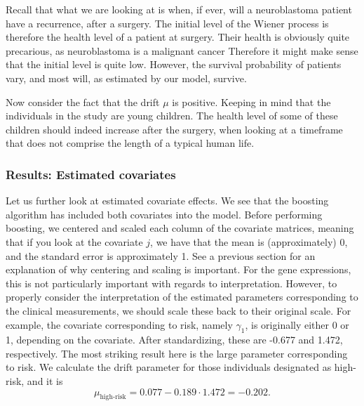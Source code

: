 Recall that what we are looking at is when, if ever, will a neuroblastoma patient have a recurrence, after a surgery.
The initial level of the Wiener process is therefore the health level of a patient at surgery.
Their health is obviously quite precarious, as neuroblastoma is a malignant cancer
Therefore it might make sense that the initial level is quite low.
However, the survival probability of patients vary, and most will, as estimated by our model, survive.

Now consider the fact that the drift $\mu$ is positive.
Keeping in mind that the individuals in the study are young children.
The health level of some of these children should indeed increase after the surgery, when looking at a timeframe that does not comprise the length of a typical human life.

\subsubsection{Results: Estimated covariates}
Let us further look at estimated covariate effects.
We see that the boosting algorithm has included both covariates into the model.
Before performing boosting, we centered and scaled each column of the covariate matrices, meaning that if you look at the covariate $j$, we have that the mean is (approximately) 0,
and the standard error is approximately 1.
See a previous section for an explanation of why centering and scaling is important.
For the gene expressions, this is not particularly important with regards to interpretation.
However, to properly consider the interpretation of the estimated parameters corresponding to the clinical measurements, we should
scale these back to their original scale.
For example, the covariate corresponding to risk, namely $\gamma_1$, is originally either 0 or 1, depending on the covariate.
After standardizing, these are -0.677 and 1.472, respectively.
The most striking result here is the large parameter corresponding to risk.
We calculate the drift parameter for those individuals designated as high-risk, and it is
\begin{equation}
    \mu_{\text{high-risk}}=0.077-0.189\cdot1.472=-0.202.
\end{equation}
